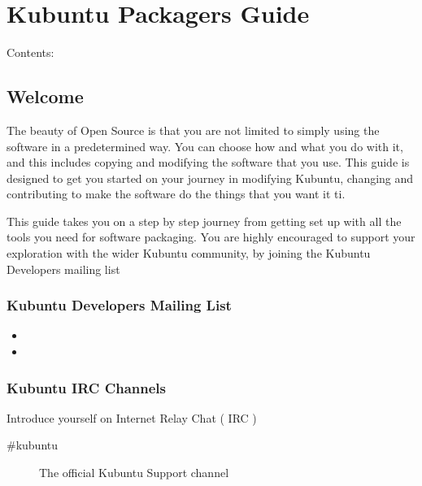 \documentclass[letterpaper,10pt,english]{sphinxmanual}
\begin{document}
\chapter{Kubuntu Packagers Guide}
\label{\detokenize{docs/packaging-guide/packaging:kubuntu-packagers-guide}}\label{\detokenize{docs/packaging-guide/packaging::doc}}
\sphinxAtStartPar
Contents:


\section{Welcome}
\label{\detokenize{docs/packaging-guide/welcome:welcome}}\label{\detokenize{docs/packaging-guide/welcome::doc}}
\sphinxAtStartPar
The beauty of Open Source is that you are not limited to simply using the software in a predetermined way. You can choose how and what you do with it, and this includes copying and modifying the software that you use.
This guide is designed to get you started on your journey in modifying Kubuntu, changing and contributing to make the software do the things that you want it ti.

\sphinxAtStartPar
This guide takes you on a step by step journey from getting set up with all the tools you need for software packaging. You are highly encouraged to support your exploration with the wider Kubuntu community, by joining the Kubuntu Developers mailing list


\subsection{Kubuntu Developers Mailing List}
\label{\detokenize{docs/packaging-guide/welcome:kubuntu-developers-mailing-list}}\begin{itemize}
\item {} 
\sphinxAtStartPar
{}

\item {} 
\sphinxAtStartPar
{}

\end{itemize}


\subsection{Kubuntu IRC Channels}
\label{\detokenize{docs/packaging-guide/welcome:kubuntu-irc-channels}}
\sphinxAtStartPar
Introduce yourself on Internet Relay Chat ( IRC )
\begin{description}
\item[{\#kubuntu}] \leavevmode
\sphinxAtStartPar
The official Kubuntu Support channel

\end{description}
\end{document}
